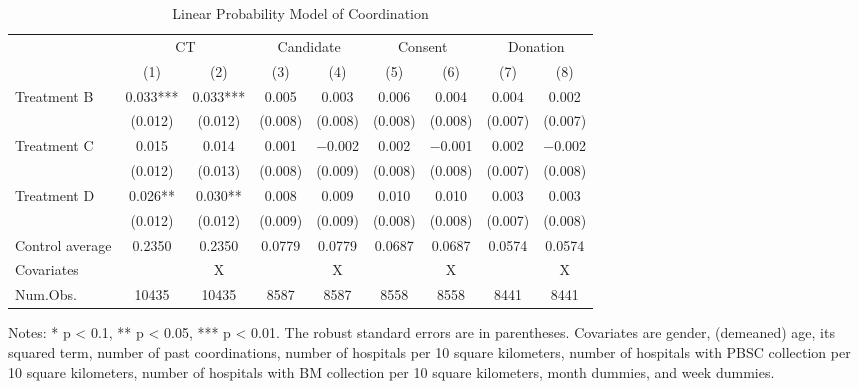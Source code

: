 \documentclass[12pt, a4paper]{article}
\begin{document}
\begin{table}

\caption{\label{tab:est-full-coordination}Linear Probability Model of Coordination}
\centering
\fontsize{9}{11}\selectfont
\begin{threeparttable}
\begin{tabular}[t]{lcccccccc}
\toprule
\multicolumn{1}{c}{ } & \multicolumn{2}{c}{CT} & \multicolumn{2}{c}{Candidate} & \multicolumn{2}{c}{Consent} & \multicolumn{2}{c}{Donation} \\
\cmidrule(l{3pt}r{3pt}){2-3} \cmidrule(l{3pt}r{3pt}){4-5} \cmidrule(l{3pt}r{3pt}){6-7} \cmidrule(l{3pt}r{3pt}){8-9}
  & (1) & (2) & (3) & (4) & (5) & (6) & (7) & (8)\\
\midrule
Treatment B & \num{0.033}*** & \num{0.033}*** & \num{0.005} & \num{0.003} & \num{0.006} & \num{0.004} & \num{0.004} & \num{0.002}\\
 & (\num{0.012}) & (\num{0.012}) & (\num{0.008}) & (\num{0.008}) & (\num{0.008}) & (\num{0.008}) & (\num{0.007}) & (\num{0.007})\\
Treatment C & \num{0.015} & \num{0.014} & \num{0.001} & \num{-0.002} & \num{0.002} & \num{-0.001} & \num{0.002} & \num{-0.002}\\
 & (\num{0.012}) & (\num{0.013}) & (\num{0.008}) & (\num{0.009}) & (\num{0.008}) & (\num{0.008}) & (\num{0.007}) & (\num{0.008})\\
Treatment D & \num{0.026}** & \num{0.030}** & \num{0.008} & \num{0.009} & \num{0.010} & \num{0.010} & \num{0.003} & \num{0.003}\\
 & (\num{0.012}) & (\num{0.012}) & (\num{0.009}) & (\num{0.009}) & (\num{0.008}) & (\num{0.008}) & (\num{0.007}) & (\num{0.008})\\
\midrule
Control average & 0.2350 & 0.2350 & 0.0779 & 0.0779 & 0.0687 & 0.0687 & 0.0574 & 0.0574\\
Covariates &  & X &  & X &  & X &  & X\\
Num.Obs. & \num{10435} & \num{10435} & \num{8587} & \num{8587} & \num{8558} & \num{8558} & \num{8441} & \num{8441}\\
\bottomrule
\end{tabular}
\begin{tablenotes}
\item Notes: * p < 0.1, ** p < 0.05, *** p < 0.01. The robust standard errors are in parentheses. Covariates are gender, (demeaned) age, its squared term, number of past coordinations, number of hospitals per 10 square kilometers, number of hospitals with PBSC collection per 10 square kilometers, number of hospitals with BM collection per 10 square kilometers, month dummies, and week dummies.
\end{tablenotes}
\end{threeparttable}
\end{table}
\end{document}
